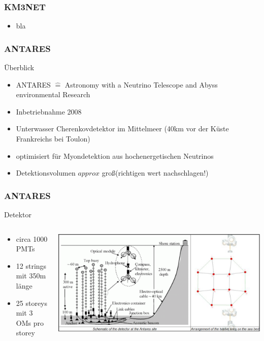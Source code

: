 \documentclass[aspectratio=1610, 9pt]{beamer}
\begin{document}
\begin{frame}\frametitle{KM3NET}
  \begin{itemize}
    \item bla
  \end{itemize}
\end{frame}

\begin{frame}\frametitle{ANTARES}
  \begin{block}{\"Uberblick}
    \begin{itemize}
      \item ANTARES $\hat{=}$ Astronomy with a Neutrino Telescope and Abyss environmental Research
      \item Inbetriebnahme 2008
      \item Unterwasser Cherenkovdetektor im Mittelmeer (40km vor der K\"uste Frankreichs bei Toulon)
      \item optimisiert f\"ur Myondetektion aus hochenergetischen Neutrinos
      \item Detektionsvolumen $approx$ gro\ss (richtigen wert nachschlagen!)
    \end{itemize}
  \end{block}
\end{frame}

\begin{frame}\frametitle{ANTARES}
\begin{block}{Detektor}
  \begin{columns}
    \begin{column}[c]{0.45\textwidth}
    \begin{itemize}
      \item circa 1000 PMTs
      \item 12 strings mit 350m l\"ange
      \item 25 storeys mit 3 OMs pro storey
    \end{itemize}
    \end{column}
    \begin{column}[c]{0.45\textwidth}
      \includegraphics{images/antares1.png}
    \end{column}
  \end{columns}
\end{block}
\end{frame}
\end{document}
